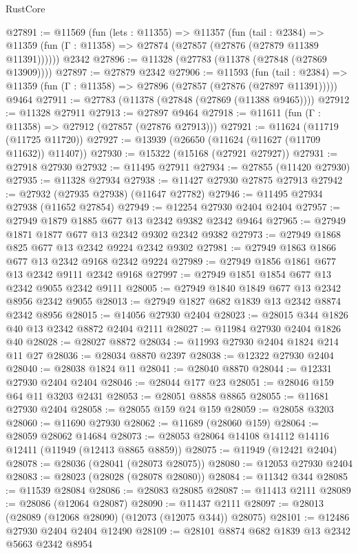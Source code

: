 \begin{lexlean}{RustCore}
\begin{coremodule}
@27891 := @11569
    (fun (lets : @11355) =>
    @11357
      (fun (tail : @2384) =>
      @11359 (fun (Γ : @11358) => @27874 (@27857 (@27876 (@27879 @11389 @11391))))))
    @2342
@27896 := @11328 (@27783 (@11378 (@27848 (@27869 @13909))))
@27897 := @27879 @2342
@27906 := @11593
    (fun (tail : @2384) => @11359 (fun (Γ : @11358) => @27896 (@27857 (@27876 (@27897 @11391)))))
    @9464
@27911 := @27783 (@11378 (@27848 (@27869 (@11388 @9465))))
@27912 := @11328 @27911
@27913 := @27897 @9464
@27918 := @11611 (fun (Γ : @11358) => @27912 (@27857 (@27876 @27913)))
@27921 := @11624 (@11719 (@11725 @11720))
@27927 := @13939 (@26650 (@11624 (@11627 (@11709 @11632)) @11407))
@27930 := @15322 (@15168 (@27921 @27927))
@27931 := @27918 @27930
@27932 := @11495 @27911
@27934 := @27855 (@11420 @27930)
@27935 := @11328 @27934
@27938 := @11427 @27930 @27875 @27913
@27942 := @27932 (@27935 @27938) (@11647 @27782)
@27946 := @11495 @27934 @27938 (@11652 @27854)
@27949 := @12254 @27930 @2404 @2404
@27957 := @27949 @1879 @1885 @677 @13 @2342 @9382 @2342 @9464
@27965 := @27949 @1871 @1877 @677 @13 @2342 @9302 @2342 @9382
@27973 := @27949 @1868 @825 @677 @13 @2342 @9224 @2342 @9302
@27981 := @27949 @1863 @1866 @677 @13 @2342 @9168 @2342 @9224
@27989 := @27949 @1856 @1861 @677 @13 @2342 @9111 @2342 @9168
@27997 := @27949 @1851 @1854 @677 @13 @2342 @9055 @2342 @9111
@28005 := @27949 @1840 @1849 @677 @13 @2342 @8956 @2342 @9055
@28013 := @27949 @1827 @682 @1839 @13 @2342 @8874 @2342 @8956
@28015 := @14056 @27930 @2404
@28023 := @28015 @344 @1826 @40 @13 @2342 @8872 @2404 @2111
@28027 := @11984 @27930 @2404 @1826 @40
@28028 := @28027 @8872
@28034 := @11993 @27930 @2404 @1824 @214 @11 @27
@28036 := @28034 @8870 @2397
@28038 := @12322 @27930 @2404
@28040 := @28038 @1824 @11
@28041 := @28040 @8870
@28044 := @12331 @27930 @2404 @2404
@28046 := @28044 @177 @23
@28051 := @28046 @159 @64 @11 @3203 @2431
@28053 := @28051 @8858 @8865
@28055 := @11681 @27930 @2404
@28058 := @28055 @159 @24 @159
@28059 := @28058 @3203
@28060 := @11690 @27930
@28062 := @11689 (@28060 @159)
@28064 := @28059 @28062 @14684
@28073 := @28053 @28064 @14108 @14112 @14116 @12411 (@11949 (@12413 @8865 @8859))
@28075 := @11949 (@12421 @2404)
@28078 := @28036 (@28041 (@28073 @28075))
@28080 := @12053 @27930 @2404
@28083 := @28023 (@28028 (@28078 @28080))
@28084 := @11342 @344
@28085 := @11539 @28084
@28086 := @28083 @28085
@28087 := @11413 @2111
@28089 := @28086 (@12064 @28087)
@28090 := @11437 @2111
@28097 := @28013 (@28089 (@12068 @28090) (@12073 (@12075 @344)) @28075)
@28101 := @12486 @27930 @2404 @2404 @12490
@28109 := @28101 @8874 @682 @1839 @13 @2342 @5663 @2342 @8954

\end{coremodule}
\end{lexlean}

